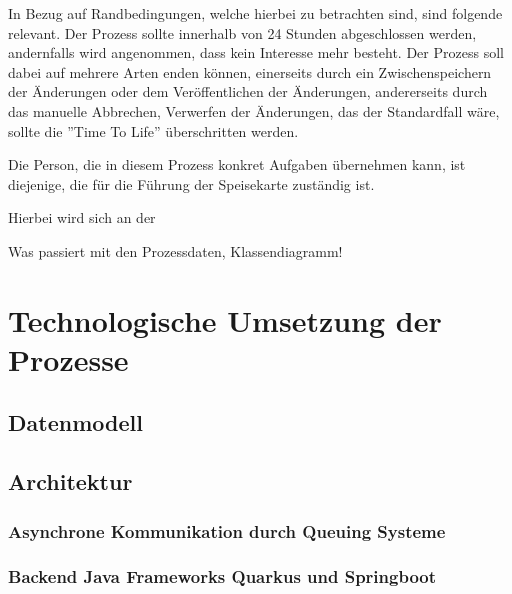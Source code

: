 In Bezug auf Randbedingungen, welche hierbei zu betrachten sind, sind folgende relevant. Der Prozess sollte innerhalb von 24 Stunden abgeschlossen werden, andernfalls wird angenommen, dass kein Interesse mehr besteht. Der Prozess soll dabei auf mehrere Arten enden können, einerseits durch ein Zwischenspeichern der Änderungen oder dem Veröffentlichen der Änderungen, andererseits durch das manuelle Abbrechen, Verwerfen der Änderungen, das der Standardfall wäre, sollte die ''Time To Life'' überschritten werden.

Die Person, die in diesem Prozess konkret Aufgaben übernehmen kann, ist diejenige, die für die Führung der Speisekarte zuständig ist.

\clearpage
{}

Hierbei wird sich an der 


Was passiert mit den Prozessdaten,  Klassendiagramm!

\section{Technologische Umsetzung der Prozesse}
\label{sec:technologie_prozesse}
\subsection{Datenmodell}
\label{sec:datenmodell}

\subsection{Architektur}

\subsubsection{Asynchrone Kommunikation durch Queuing Systeme}
\subsubsection{Backend Java Frameworks Quarkus und Springboot}
